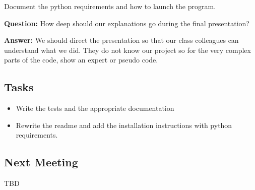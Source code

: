Document the python requirements and how to launch the program.

\textbf{Question:} How deep should our explanations go during the final
presentation?

\textbf{Answer:} We should direct the presentation so that our class colleagues
can understand what we did. They do not know our project so for the very complex
parts of the code, show an expert or pseudo code.

\subsection*{Tasks}
    \begin{itemize}
        \item Write the tests and the appropriate documentation
        \item Rewrite the readme and add the installation instructions with
            python requirements.
    \end{itemize}
\subsection*{Next Meeting}
TBD

